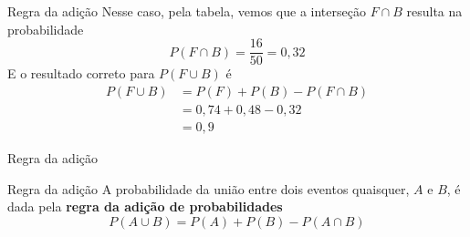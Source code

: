 \documentclass[10pt]{beamer}\usepackage[]{graphicx}\usepackage[]{color}
\theoremstyle{definition}
\begin{document}
\begin{frame}[fragile]{Regra da adição}
  Nesse caso, pela tabela, vemos que a interseção $F \cap B$ resulta na
  probabilidade
  \begin{equation*}
    P(F \cap B) = \frac{16}{50} = 0,32
  \end{equation*}
  E o resultado correto para $P(F \cup B)$ é
  \begin{align*}
    P(F \cup B) &= P(F) + P(B) - P(F \cap B) \\
    &= 0,74 + 0,48 - 0,32 \\
    &= 0,9
  \end{align*}
\end{frame}

\begin{frame}[fragile]{Regra da adição}
  \begin{block}{Regra da adição}
    A probabilidade da união entre dois eventos quaisquer, $A$ e $B$, é
    dada pela \textbf{regra da adição de probabilidades}
    \begin{equation*}
      P(A \cup B) = P(A) + P(B) - P(A \cap B)
    \end{equation*}
  \end{block}
  \vspace{1em}
\def\firstcircle{(0,0) circle (1.0cm)}
\def\secondcircle{(0:1.5cm) circle (1.0cm)}




  \begin{columns}[c]
    \centering
    \centering
  \end{columns}


\end{frame}
\end{document}
